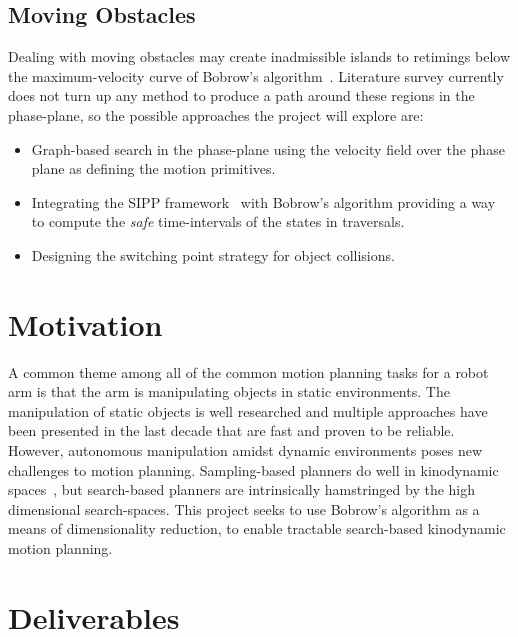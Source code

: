 \documentclass[letterpaper,10pt]{article} %
\begin{document}
\subsection{Moving Obstacles}\label{subsec:movobs}
Dealing with moving obstacles may create inadmissible islands to retimings below the maximum-velocity curve of Bobrow's algorithm~\cite{shin1985minimum}. Literature survey currently does not turn up any method to produce a path around these regions in the phase-plane, so the possible approaches the project will explore are:

\begin{itemize}
\item Graph-based search in the phase-plane using the velocity field over the phase plane as defining the motion primitives.
\item Integrating the SIPP framework~\cite{phillips2011sipp} with Bobrow's algorithm providing a way to compute the \emph{safe} time-intervals of the states in traversals.
\item Designing the switching point strategy for object collisions.
\end{itemize}


\section{Motivation}

A common theme among all of the common motion planning tasks for a robot arm is that the arm is manipulating objects in static environments. The manipulation of static objects is well researched and multiple approaches have been presented in the last decade  that are fast and proven to be reliable. However, autonomous manipulation amidst dynamic environments poses new challenges to motion planning. Sampling-based planners do well in kinodynamic spaces~\cite{lavalle2001randomized}, but search-based planners are intrinsically hamstringed by the high dimensional search-spaces. This project seeks to use Bobrow's algorithm as a means of dimensionality reduction, to enable tractable search-based kinodynamic motion planning.


\section{Deliverables}
\end{document}
